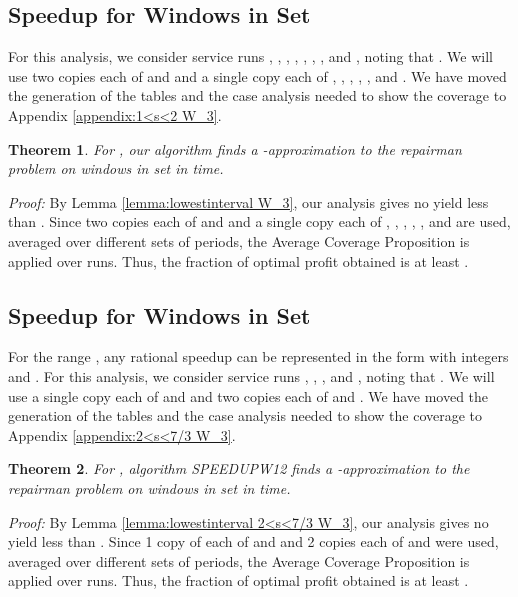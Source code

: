 \documentclass[11pt]{article}
\newtheorem{theorem}{Theorem}[section]
\newcommand\QED{\ifhmode\allowbreak\else\nobreak\fi
\quad\nobreak\medbreak}
\newcommand{\proofstart}{\par\noindent \emph{Proof:} }
\newcommand{\proofend}{\QED\par}
\newenvironment{proof}{\proofstart}{\proofend}
\begin{document}
\subsection{Speedup  for Windows in Set }

For this analysis, we consider service runs , , , , , , , and , noting that .  We will use two copies each of  and  and a single copy each of , , , , , and .  We have moved the generation of the tables and the case analysis needed to show the coverage to Appendix \ref{appendix:1<s<2 W_3}.

\begin{theorem}
For , our algorithm finds a -approximation to the repairman problem on windows in set  in  time.
\end{theorem}

\begin{proof}
By Lemma \ref{lemma:lowestinterval W_3}, our analysis gives no yield less than .  Since two copies each of  and  and a single copy each of , , , , , and  are used, averaged over  different sets of periods, the Average Coverage Proposition is applied over  runs.  Thus, the fraction of optimal profit obtained is at least .
\end{proof}

\subsection{Speedup  for Windows in Set }

For the range , any rational speedup  can be represented in the form  with integers  and .  For this analysis, we consider service runs , , , and , noting that .  We will use a single copy each of  and  and two copies each of  and .  We have moved the  generation of the tables and the case analysis needed to show the coverage to Appendix \ref{appendix:2<s<7/3 W_3}.

\begin{theorem}
For , algorithm SPEEDUPW12 finds a -approximation to the repairman problem on windows in set  in  time.
\end{theorem}

\begin{proof}
By Lemma \ref{lemma:lowestinterval 2<s<7/3 W_3}, our analysis gives no yield less than .  Since 1 copy of each of  and  and 2 copies each of  and  were used, averaged over  different sets of periods, the Average Coverage Proposition is applied over  runs.  Thus, the fraction of optimal profit obtained is at least .
\end{proof}
\end{document}
